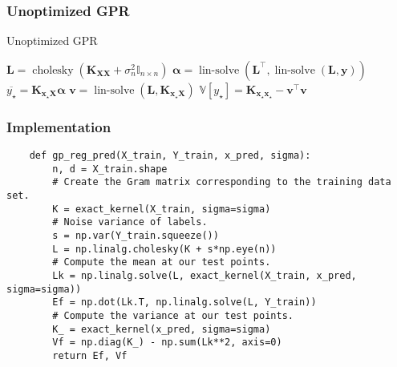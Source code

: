 \documentclass[9pt,hyperref={pdfpagelabels=false},xcolor=table]{beamer}
\begin{document}
\begin{frame}
    \frametitle{Unoptimized GPR}
    {\centering
        \begin{minipage}{.9\linewidth}
            \begin{algorithm}[H]
                \caption{Unoptimized GPR}
                \SetAlgoLined
                \DontPrintSemicolon

                \BlankLine
                $\bm{L} = \operatorname{cholesky} \left( \bm{K_{XX}} + \sigma_n^2 \mathbb{I}_{n \times n} \right)$\;
                $\bm{\alpha} = \operatorname{lin-solve} \left( \bm{L}^{\intercal} , \operatorname{lin-solve} \left( \bm{L}, \bm{y} \right) \right)$\;
                $\overline{y_{\star}} = \bm{K_{x_{\star} X}} \bm{\alpha}$\;
                $\bm{v} = \operatorname{lin-solve} \left( \bm{L}, \bm{K_{x_{\star} X}} \right)$\;
                $\mathbb{V} \left[ y_{\star} \right] = \bm{K_{x_{\star} x_{\star}}} - \bm{v}^{\intercal} \bm{v}$\;
                \BlankLine
            \end{algorithm}
        \end{minipage}
        \par
    }
\end{frame}

\begin{frame}[fragile]
    \frametitle{Implementation}

    \begin{verbatim}
    def gp_reg_pred(X_train, Y_train, x_pred, sigma):
        n, d = X_train.shape
        # Create the Gram matrix corresponding to the training data set.
        K = exact_kernel(X_train, sigma=sigma)
        # Noise variance of labels.
        s = np.var(Y_train.squeeze())
        L = np.linalg.cholesky(K + s*np.eye(n))
        # Compute the mean at our test points.
        Lk = np.linalg.solve(L, exact_kernel(X_train, x_pred, sigma=sigma))
        Ef = np.dot(Lk.T, np.linalg.solve(L, Y_train))
        # Compute the variance at our test points.
        K_ = exact_kernel(x_pred, sigma=sigma)
        Vf = np.diag(K_) - np.sum(Lk**2, axis=0)
        return Ef, Vf
    \end{verbatim}

\end{frame}
\end{document}
